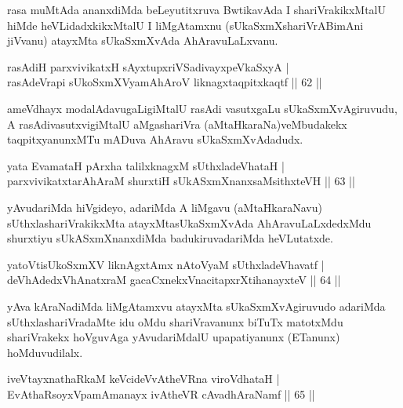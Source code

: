 \begin{artha}
rasa muMtAda ananxdiMda beLeyutitxruva BwtikavAda I shariVrakikxMtalU hiMde heVLidadxkikxMtalU I liMgAtamxnu (sUkaSxmXshariVrABimAni jiVvanu) atayxMta sUkaSxmXvAda AhAravuLaLxvanu.
\end{artha}


\begin{shl}
rasAdiH parxvivikatxH sAyxtupxriVSadivayxpeVkaSxyA |\\
rasAdeVrapi sUkoSxmXV\s yamAhAroV liknagxtaqpitxkaqtf \hfill || 62 || 
\end{shl}

\begin{artha}
ameVdhayx modalAdavugaLigiMtalU rasAdi vasutxgaLu sUkaSxmXvAgiruvudu, A rasAdivasutxvigiMtalU aMgashariVra (aMtaHkaraNa)veMbudakekx taqpitxyanunxMTu mADuva AhAravu sUkaSxmXvAdadudx.
\end{artha}

\begin{shl}
yata EvamataH pArxha talilxknagxM sUthxladeVhataH |\\
parxvivikatxtarAhAraM shurxtiH sUkASxmXnanxsaMsithxteVH \hfill || 63 || 
\end{shl}

\begin{artha}
yAvudariMda hiVgideyo, adariMda A liMgavu (aMtaHkaraNavu) sUthxlashariVrakikxMta atayxMtasUkaSxmXvAda AhAravuLaLxdedxMdu shurxtiyu sUkASxmXnanxdiMda badukiruvadariMda heVLutatxde.
\end{artha}

\begin{shl}
yatoV\s tisUkoSxmXV liknAgxtAmx nAtoV\s yaM sUthxladeVhavatf |\\
deVhAdedxVhAnatxraM gacaCxnekxVnacitapxrXtihanayxteV \hfill || 64 || 
\end{shl}

\begin{artha}
yAva kAraNadiMda liMgAtamxvu atayxMta sUkaSxmXvAgiruvudo adariMda sUthxlashariVradaMte idu oMdu shariVravanunx biTuTx matotxMdu shariVrakekx hoVguvAga yAvudariMdalU upapatiyanunx (ETanunx) hoMduvudilalx.
\end{artha}


\begin{shl}
iveVtayxnathaRkaM keVcideVvAtheVRna viroVdhataH |\\
EvAthaRsoyxVpamAmanayx ivAtheVR cAvadhAraNamf \hfill || 65 || 
\end{shl}

